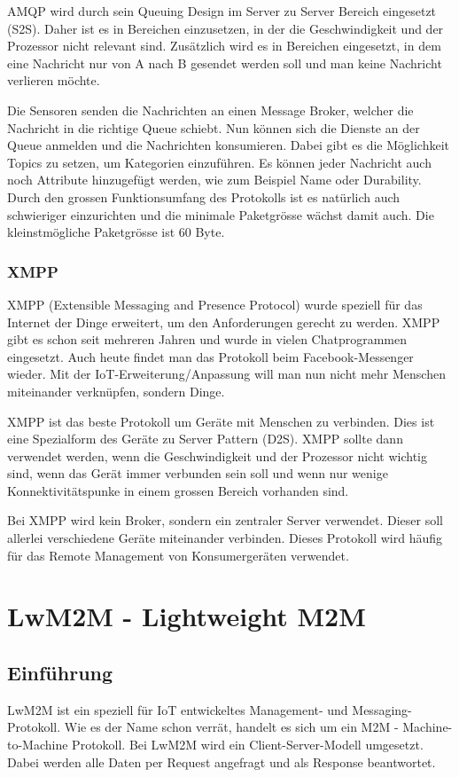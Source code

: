 AMQP wird durch sein Queuing Design im Server zu Server Bereich eingesetzt (S2S).\cite{ProtPubSub} Daher ist es in Bereichen einzusetzen, in der die Geschwindigkeit und der Prozessor nicht relevant sind. Zusätzlich wird es in Bereichen eingesetzt, in dem eine Nachricht nur von A nach B gesendet werden soll und man keine Nachricht verlieren möchte.

Die Sensoren senden die Nachrichten an einen Message Broker, welcher die Nachricht in die richtige Queue schiebt. Nun können sich die Dienste an der Queue anmelden und die Nachrichten konsumieren. Dabei gibt es die Möglichkeit Topics zu setzen, um Kategorien einzuführen. Es können jeder Nachricht auch noch Attribute hinzugefügt werden, wie zum Beispiel Name oder Durability. Durch den grossen Funktionsumfang des Protokolls ist es natürlich auch schwieriger einzurichten und die minimale Paketgrösse wächst damit auch. Die kleinstmögliche Paketgrösse ist 60 Byte.
\subsubsection{XMPP}
XMPP (Extensible Messaging and Presence Protocol) wurde speziell für das Internet der Dinge erweitert, um den Anforderungen gerecht zu werden. XMPP gibt es schon seit mehreren Jahren und wurde in vielen Chatprogrammen eingesetzt. Auch heute findet man das Protokoll beim Facebook-Messenger wieder. Mit der IoT-Erweiterung/Anpassung will man nun nicht mehr Menschen miteinander verknüpfen, sondern Dinge. 

XMPP ist das beste Protokoll um Geräte mit Menschen zu verbinden. Dies ist eine Spezialform des Geräte zu Server Pattern (D2S). \cite{ProtPubSub} XMPP sollte dann verwendet werden, wenn die Geschwindigkeit und der Prozessor nicht wichtig sind, wenn das Gerät immer verbunden sein soll und wenn nur wenige Konnektivitätspunke in einem grossen Bereich vorhanden sind.\cite{ProtPubSubReason}

Bei XMPP wird kein Broker, sondern ein zentraler Server verwendet. Dieser soll allerlei verschiedene Geräte miteinander verbinden. Dieses Protokoll wird häufig für das Remote Management von Konsumergeräten verwendet.

\newpage

\section{LwM2M - Lightweight M2M}
\subsection{Einführung}
LwM2M ist ein speziell für IoT entwickeltes Management- und Messaging-Protokoll. Wie es der Name schon verrät, handelt es sich um ein M2M - Machine-to-Machine Protokoll. Bei LwM2M wird ein Client-Server-Modell umgesetzt. Dabei werden alle Daten per Request angefragt und als Response beantwortet.

